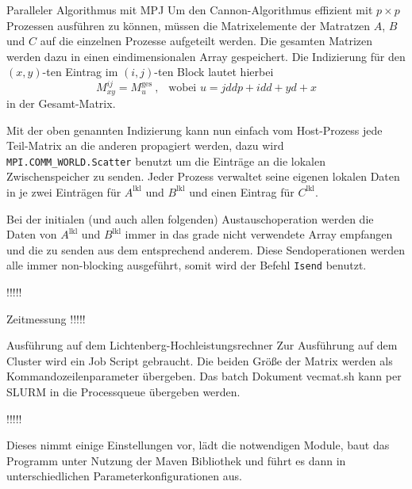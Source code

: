 \documentclass[
ngerman,
subtask=ruled %
]{tudaexercise}
\begin{document}
	
	\begin{task}{Paralleler Algorithmus mit MPJ}
		Um den Cannon-Algorithmus effizient mit $p \times p$ Prozessen ausführen zu können,
		müssen die Matrixelemente der Matratzen $A$, $B$ und $C$ auf die einzelnen Prozesse aufgeteilt werden.
		Die gesamten Matrizen werden dazu in einen eindimensionalen Array gespeichert. 
		Die Indizierung für den $(x,y)$-ten Eintrag im $(i,j)$-ten Block lautet hierbei
		\begin{equation*}
			M_{xy}^{ij} = {M}_{u}^{\mathrm{ges}}~,~~\text{ wobei } u =jddp +idd + yd +x
		\end{equation*}
		in der Gesamt-Matrix.
		
		Mit der oben genannten Indizierung kann nun einfach vom Host-Prozess jede Teil-Matrix an die anderen propagiert werden,
		dazu wird \texttt{MPI.COMM\_WORLD.Scatter} benutzt um die Einträge an die lokalen Zwischenspeicher zu senden.
		Jeder Prozess verwaltet seine eigenen lokalen Daten in je zwei Einträgen für $A^{\mathrm{lkl}}$ und $B^{\mathrm{lkl}}$ und einen Eintrag für $C^{\mathrm{lkl}}$.
		
		Bei der initialen (und auch allen folgenden) Austauschoperation werden die Daten von $A^{\mathrm{lkl}}$ und $B^{\mathrm{lkl}}$ immer in das grade nicht verwendete Array empfangen und die zu senden aus dem entsprechend anderem.
		Diese Sendoperationen werden alle immer non-blocking ausgeführt, somit wird der Befehl \texttt{Isend} benutzt.
		
		!!!!!
	
	\end{task}
	
	\begin{task}{Zeitmessung}
		!!!!!
	
		
	\end{task}
	
	\begin{task}{Ausführung auf dem Lichtenberg-Hochleistungsrechner} 
		Zur Ausführung auf dem Cluster wird ein Job Script gebraucht. 
		Die beiden Größe der Matrix werden als Kommandozeilenparameter übergeben.
		Das batch Dokument vecmat.sh kann per SLURM in die Processqueue übergeben werden.
		
		!!!!!
		
		Dieses nimmt einige Einstellungen vor, lädt die notwendigen Module, baut das Programm unter Nutzung der Maven Bibliothek und führt es dann in unterschiedlichen Parameterkonfigurationen aus.
	\end{task}
\end{document}
